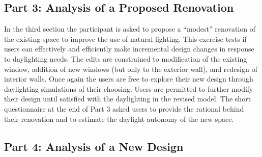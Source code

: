 \documentclass[preprint]{elsarticle}
\begin{document}
\subsection{Part 3: Analysis of a Proposed Renovation}


In the third section the participant is asked to propose
a ``modest'' renovation of the existing space to improve the use of
natural lighting.  This exercise tests if users can effectively and
efficiently make incremental design changes in response to daylighting
needs.  
The edits are constrained to
modification of the existing window, addition of new windows (but
only to the exterior wall), and redesign of interior walls.  Once
again the users are free to explore their new design through
daylighting simulations of their choosing.  Users are permitted to
further modify their design until satisfied with the daylighting in
the revised model.
%
The short questionnaire at the end of Part 3 asked users to provide
the rational behind their renovation and to estimate the daylight
autonomy of the new space.  


\subsection{Part 4: Analysis of a New Design}

\end{document}
